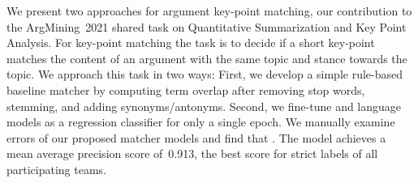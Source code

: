 We present two approaches for argument key-point matching, our contribution to the ArgMining~2021 shared task on Quantitative Summarization and Key Point Analysis.
For key-point matching the task is to decide if a short key-point matches the content of an argument with the same topic and stance towards the topic.
We approach this task in two ways:
First, we develop a simple rule-based baseline matcher by computing term overlap after removing stop words, stemming, and adding synonyms/antonyms.
Second, we fine-tune \Bert and \Roberta language models as a regression classifier for only a single epoch.
We manually examine errors of our proposed matcher models and find that .
The \RobertaBase model achieves a mean average precision score of~0.913, the best score for strict labels of all participating teams.
